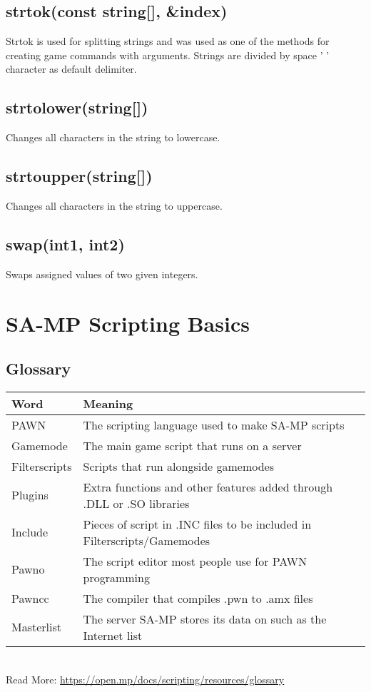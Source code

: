 \documentclass{article}
\begin{document}
\subsection{strtok(const string[], \&index)}
Strtok is used for splitting strings and was used as one of the methods for creating game commands with arguments. Strings are divided by space ' ' character as default delimiter.

\subsection{strtolower(string[])}
Changes all characters in the string to lowercase.

\subsection{strtoupper(string[])}
Changes all characters in the string to uppercase.

\subsection{swap(int1, int2)}
Swaps assigned values of two given integers.


\newpage
\section{SA-MP Scripting Basics}

\subsection{Glossary}
\begin{tabular}{ |l|l| } 
\hline
Word & Meaning \\
\hline
PAWN & The scripting language used to make SA-MP scripts \\
Gamemode & The main game script that runs on a server \\
Filterscripts & Scripts that run alongside gamemodes \\
Plugins & Extra functions and other features added through .DLL or .SO libraries \\
Include & Pieces of script in .INC files to be included in Filterscripts/Gamemodes \\
Pawno & The script editor most people use for PAWN programming \\
Pawncc & The compiler that compiles .pwn to .amx files \\
Masterlist & The server SA-MP stores its data on such as the Internet list \\
\hline
\end{tabular}
\bigskip
\\Read More: \url{https://open.mp/docs/scripting/resources/glossary}
\end{document}
